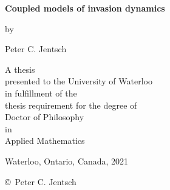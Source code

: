 \pagestyle{empty}

\begin{titlepage}
        \begin{center}
        \vspace*{1.0cm}

        \Huge
        {\bf Coupled models of invasion dynamics}

        \vspace*{1.0cm}

        \normalsize
        by \\

        \vspace*{1.0cm}

        \Large
        Peter C. Jentsch \\

        \vspace*{3.0cm}

        \normalsize
        A thesis \\
        presented to the University of Waterloo \\ 
        in fulfillment of the \\
        thesis requirement for the degree of \\
        Doctor of Philosophy \\
        in \\
        Applied Mathematics \\

        \vspace*{2.0cm}

        Waterloo, Ontario, Canada, 2021 \\

        \vspace*{1.0cm}

        \copyright\ Peter C. Jentsch \\
        \end{center}
\end{titlepage}

\pagestyle{plain}
\setcounter{page}{2}

